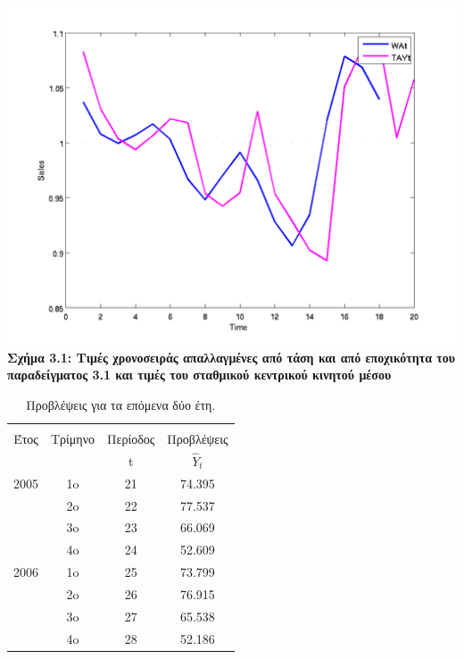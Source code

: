 \begin{table} [h]
\begin{center}
\begin{tabular}{|c|c|c|c|c|c|c|c|}
      \hline
    \end{tabular}
  \end{center}
\end{table}

\begin{center}
\includegraphics[scale=0.7]{graff6.png}\\   
\textbf{Σχήμα 3.1: Τιμές χρονοσειράς απαλλαγμένες από τάση και από εποχικότητα του παραδείγματος 3.1 και τιμές του σταθμικού κεντρικού κινητού μέσου}
\end{center}

\begin{table} [h]
  \caption{Προβλέψεις για τα επόμενα δύο έτη.} 
  \label{tab_5}
  \begin{center}
    \begin{tabular}{|c |c | c| c|}
      \hline 
       &  &  &  \\
       Έτος &Τρίμηνο   &Περίοδος   &Προβλέψεις  \\
       &   & t  & $\widehat{Y}_t$  \\    
       \hline \hline
       2005 & 1o & 21 & 74.395 \\
            & 2o & 22 & 77.537 \\
            & 3o & 23 & 66.069 \\
            & 4o & 24 & 52.609 \\
       2006 & 1o & 25 & 73.799 \\
            & 2o & 26 & 76.915 \\
            & 3o & 27 & 65.538 \\
            & 4o & 28 & 52.186 \\     
      \hline
    \end{tabular}
  \end{center}
\end{table}

